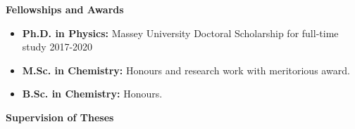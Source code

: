 \documentclass[12pt]{extarticle}
\begin{document}

{\bf\Large Fellowships \textcolor{azul}{and Awards}}\\ \vspace*{-6mm}

\begin{itemize}
 \itemsep-1mm
  \item {\bf Ph.D. in Physics:} Massey University Doctoral Scholarship for full-time study 2017-2020
  \item {\bf M.Sc. in Chemistry:} Honours and research work with meritorious award.
  \item {\bf B.Sc. in Chemistry:} Honours.  
  
\end{itemize}


%
%
%
%

%


{\bf\Large Supervision \textcolor{azul}{of Theses}}\\ \vspace*{-6mm}
\end{document}
